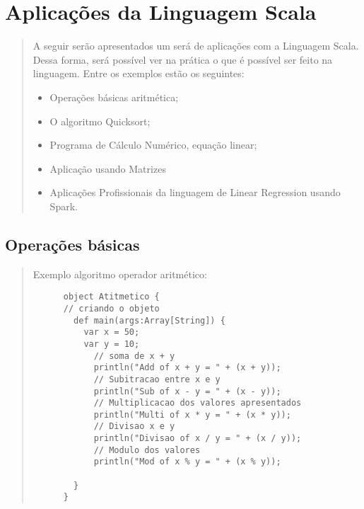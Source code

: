 


\chapter{ Aplica\c{c}\~{o}es da Linguagem Scala}
\begin{quote}
  A seguir serão apresentados um será de aplicações com a Linguagem Scala. Dessa forma, será possível ver na prática o que é possível ser feito na linguagem.
  \cite{alexander2013scala}
  \hspace{2.5mm}Entre os exemplos estão os seguintes:
  \begin{itemize}
    \item Operações básicas aritmética;
    \item O algoritmo Quicksort;
    \item Programa de Cálculo Numérico, equação linear;
    \item Aplicação usando Matrizes
    \item Aplicações Profissionais da linguagem de Linear Regression usando Spark.
  \end{itemize}



\end{quote}

\section{Opera\c{c}\~{o}es b\'{a}sicas}
\begin{quote}

  \hspace{2.5mm}Exemplo algoritmo operador aritmético:
  \cite{alexander2013scala}
  \begin{lstlisting}
      object Atitmetico {
      // criando o objeto
        def main(args:Array[String]) {
          var x = 50;
          var y = 10;
            // soma de x + y
            println("Add of x + y = " + (x + y));
            // Subitracao entre x e y
            println("Sub of x - y = " + (x - y));
            // Multiplicacao dos valores apresentados
            println("Multi of x * y = " + (x * y));
            // Divisao x e y
            println("Divisao of x / y = " + (x / y));
            // Modulo dos valores
            println("Mod of x % y = " + (x % y));

        }
      }
    \end{lstlisting}

\end{quote}
